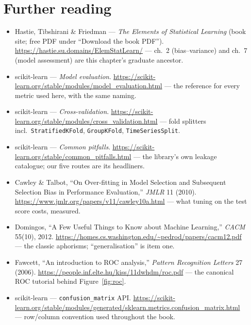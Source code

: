 \section*{Further reading}
\begin{itemize}
\item Hastie, Tibshirani \& Friedman --- \emph{The Elements of Statistical
  Learning} (book site; free PDF under ``Download the book PDF'').
  \url{https://hastie.su.domains/ElemStatLearn/} --- ch.~2 (bias--variance)
  and ch.~7 (model assessment) are this chapter's graduate ancestor.
\item scikit-learn --- \emph{Model evaluation}.
  \url{https://scikit-learn.org/stable/modules/model_evaluation.html} ---
  the reference for every metric used here, with the same naming.
\item scikit-learn --- \emph{Cross-validation}.
  \url{https://scikit-learn.org/stable/modules/cross_validation.html} ---
  fold splitters incl.\ \texttt{StratifiedKFold}, \texttt{GroupKFold},
  \texttt{TimeSeriesSplit}.
\item scikit-learn --- \emph{Common pitfalls}.
  \url{https://scikit-learn.org/stable/common_pitfalls.html} --- the
  library's own leakage catalogue; our five routes are its headliners.
\item Cawley \& Talbot, ``On Over-fitting in Model Selection and Subsequent
  Selection Bias in Performance Evaluation,'' \emph{JMLR} 11 (2010).
  \url{https://www.jmlr.org/papers/v11/cawley10a.html} --- what tuning on
  the test score costs, measured.
\item Domingos, ``A Few Useful Things to Know about Machine Learning,''
  \emph{CACM} 55(10), 2012.
  \url{https://homes.cs.washington.edu/~pedrod/papers/cacm12.pdf} ---
  the classic aphorisms; ``generalisation'' is item one.
\item Fawcett, ``An introduction to ROC analysis,'' \emph{Pattern
  Recognition Letters} 27 (2006).
  \url{https://people.inf.elte.hu/kiss/11dwhdm/roc.pdf} --- the canonical
  ROC tutorial behind Figure~\ref{fig:roc}.
\item scikit-learn --- \texttt{confusion\_matrix} API.
  \url{https://scikit-learn.org/stable/modules/generated/sklearn.metrics.confusion_matrix.html}
  --- row/column convention used throughout the book.
\end{itemize}

